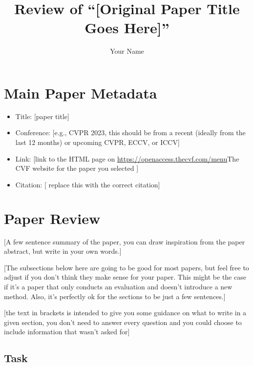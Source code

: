 \documentclass[10pt,twocolumn,letterpaper]{article}
\begin{document}
\title{Review of ``[Original Paper Title Goes Here]''}

\author{
Your Name
}
\maketitle

\section{Main Paper Metadata}

\begin{itemize}

\item Title: [paper title]
\item Conference: [e.g., CVPR 2023, this should be from a recent (ideally from the last 12 months) or upcoming CVPR, ECCV, or ICCV]
\item Link: [link to the HTML page on \url{https://openaccess.thecvf.com/menu}{The CVF website} for the paper you selected
\href{https://openaccess.thecvf.com/content/CVPR2022/html/Zhu_TransGeo_Transformer_Is_All_You_Need_for_Cross-View_Image_Geo-Localization_CVPR_2022_paper.html}]
\item Citation: [\cite{Alpher02} replace this with the correct citation]

\end{itemize}

\section{Paper Review}

[A few sentence summary of the paper, you can draw inspiration from the paper abstract, but write in your own words.]

[The subsections below here are going to be good for most papers, but feel free to adjust if you don't think they make sense for your paper. This might be the case if it's a paper that only conducts an evaluation and doesn't introduce a new method. Also, it's perfectly ok for the sections to be just a few sentences.]

[the text in brackets is intended to give you some guidance on what to write in a given section, you don't need to answer every question and you could choose to include information that wasn't asked for]

\subsection{Task}
\end{document}
